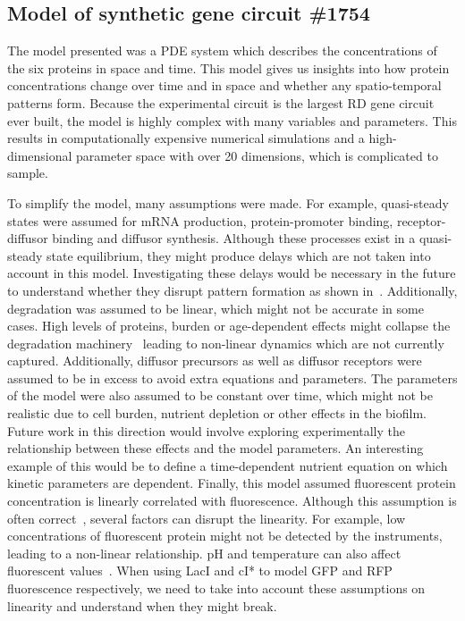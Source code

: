 \subsection{Model of synthetic gene circuit \#1754}
The model presented was a PDE system which describes the concentrations of the six proteins in space and time.
This model gives us insights into how protein concentrations change over time and in space and whether any spatio-temporal patterns form.
Because the experimental circuit is the largest RD gene circuit ever built, the model is highly complex with many variables and parameters.
This results in computationally expensive numerical simulations and a high-dimensional parameter space with over 20 dimensions, which is complicated to sample.

To simplify the model, many assumptions were made.
For example, quasi-steady states were assumed for mRNA production, protein-promoter binding, receptor-diffusor binding and diffusor synthesis.
Although these processes exist in a quasi-steady state equilibrium, they might produce delays which are not taken into account in this model.
Investigating these delays would be necessary in the future to understand whether they disrupt pattern formation as shown in~\cite{Maini2012}.
Additionally, degradation was assumed to be linear, which might not be accurate in some cases.
High levels of proteins, burden or age-dependent effects might collapse the degradation machinery~\parencite{kintaka2020genetic} leading to non-linear dynamics which are not currently captured.
Additionally, diffusor precursors as well as diffusor receptors were assumed to be in excess to avoid extra equations and parameters.
The parameters of the model were also assumed to be constant over time, which might not be realistic due to cell burden, nutrient depletion or other effects in the biofilm.
Future work in this direction would involve exploring experimentally the relationship between these effects and the model parameters.
An interesting example of this would be to define a time-dependent nutrient equation on which kinetic parameters are dependent.
Finally, this model assumed fluorescent protein concentration is linearly correlated with fluorescence.
Although this assumption is often correct~\parencite{soboleski2005green, csibra2022absolute}, several factors can disrupt the linearity.
For example, low concentrations of fluorescent protein might not be detected by the instruments, leading to a non-linear relationship.
pH and temperature can also affect fluorescent values~\parencite{ward1982spectral}.
When using LacI and cI* to model GFP and RFP fluorescence respectively, we need to take into account these assumptions on linearity and understand when they might break.

